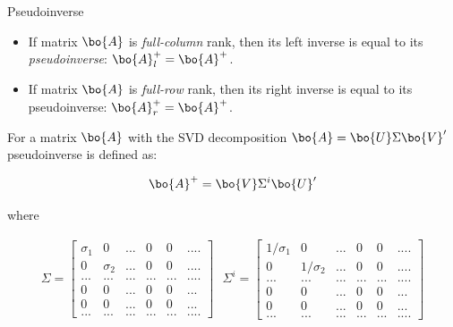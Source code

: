 \documentclass{beamer}
\begin{document}
\begin{frame}{Pseudoinverse}
	\begin{flushleft}
		
		{\small
		\begin{itemize}
			
			\item If matrix $\bo{A}$ is \emph{full-column} rank, then its left inverse is equal to its \emph{pseudoinverse}: $\bo{A}^+_l = \bo{A}^+$.
			
			\item If matrix $\bo{A}$ is \emph{full-row} rank, then its right inverse is equal to its pseudoinverse: $\bo{A}^+_r = \bo{A}^+$.
			
		\end{itemize}
		
		For a matrix $\bo{A}$ with the SVD decomposition $\bo{A} = \bo{U} \Sigma \bo{V}'$ pseudoinverse is defined as:
		
		\begin{equation}
			\bo{A}^+ = \bo{V} \Sigma^i \bo{U}'
		\end{equation}
		
		where
		
		\begin{align*}
			 \Sigma = \begin{bmatrix}
			 	\sigma_1 & 0 & ... & 0 & 0 & .... \\
			 	0 & \sigma_2 & ... & 0 & 0 & .... \\
			 	... & ... &  ... & ... & ... & .... \\
			 	0& 0& ...& 0 & 0& ... \\
			 	0& 0& ...& 0 & 0& ... \\
			 	... & ... &  ... & ... & ... & .... 
			 \end{bmatrix} 
			 \ \ \
			 \Sigma^i  = \begin{bmatrix}
			 	1 /  \sigma_1 & 0 & ... & 0 & 0 & .... \\
			 	0 & 1 /  \sigma_2 & ... & 0 & 0 & .... \\
			 	... & ... &  ... & ... & ... & .... \\
			 	0& 0& ...& 0 & 0& ... \\
			 	0& 0& ...& 0 & 0& ... \\
			 	... & ... &  ... & ... & ... & .... 
			 \end{bmatrix}
		\end{align*}		
	}
		
	\end{flushleft}
\end{frame}
\end{document}
